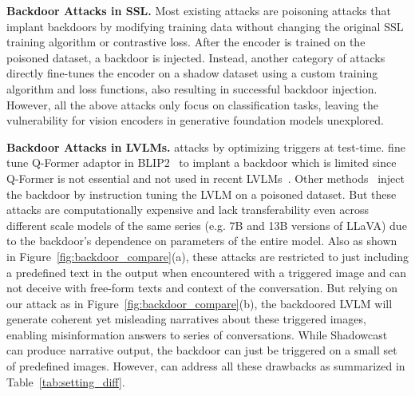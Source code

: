 \noindent \textbf{Backdoor Attacks in SSL.} 
Most existing attacks \cite{zhang2024data,li2023embarrassingly,liang2024badclip,carlini2021poisoning,saha2022backdoor} are poisoning attacks that implant backdoors by modifying training data without changing the original SSL training algorithm or contrastive loss. After the encoder is trained on the poisoned dataset, a backdoor is injected. Instead, another category of attacks \cite{jia2022badencoder,wang2024ghostencoder,tao2023distribution} directly fine-tunes the encoder on a shadow dataset using a custom training algorithm and loss functions, also resulting in successful backdoor injection. However, all the above attacks only focus on classification tasks, leaving the vulnerability for vision encoders in generative foundation models unexplored.

\noindent \textbf{Backdoor Attacks in LVLMs.}
\cite{lu2024test} attacks by optimizing triggers at test-time. \cite{lyu2024trojvlm,lyu2024backdooring} fine tune Q-Former adaptor in BLIP2~\cite{li2023blip} to implant a backdoor which is limited since Q-Former is not essential and not used in recent LVLMs~\cite{chen2023minigpt,liu2024visual}. Other methods~\cite{liang2024vl,liang2024revisiting,tao2024imgtrojan,ni2024physical} inject the backdoor by instruction tuning the LVLM on a poisoned dataset. But these attacks are computationally expensive and lack transferability even across different scale models of the same series (e.g. 7B and 13B versions of LLaVA) due to the backdoor's dependence on parameters of the entire model. Also as shown in Figure~\ref{fig:backdoor_compare}(a), these attacks are restricted to just including a predefined text in the output when encountered with a triggered image and can not deceive with free-form texts and context of the conversation. But relying on our attack as in Figure~\ref{fig:backdoor_compare}(b), the backdoored LVLM will generate coherent yet misleading narratives about these triggered images, enabling misinformation answers to series of conversations. While Shadowcast~\cite{xu2024shadowcast} can produce narrative output, the backdoor can just be triggered on a small set of predefined images. However, \project can address all these drawbacks as summarized in Table~\ref{tab:setting_diff}.
